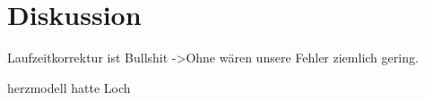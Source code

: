 \section{Diskussion}
\label{sec:Diskussion}

Laufzeitkorrektur ist Bullshit ->Ohne wären unsere Fehler ziemlich gering.


herzmodell hatte Loch
